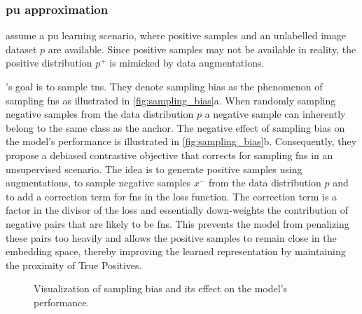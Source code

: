 \subsubsection{\acl{pu} approximation}\label{subsec:pu_approximation}

\citet{chuang_debiased_2020} assume a \acf{pu} learning scenario, 
where positive samples and an unlabelled image dataset $p$ are available.
Since positive samples may not be available in reality, 
the positive distribution $p^+$ is mimicked by data augmentations.

\citeauthor{chuang_debiased_2020}'s goal is to sample \acp{tn}.
They denote sampling bias as the phenomenon of sampling \acp{fn} as illustrated in \autoref{fig:sampling_bias}a.
When randomly sampling negative samples from the data distribution $p$ 
a negative sample can inherently belong to the same class as the anchor.
The negative effect of sampling bias on the model's performance is illustrated in \autoref{fig:sampling_bias}b. %
Consequently, they propose a debiased contrastive objective that corrects for sampling \acp{fn} 
in an unsupervised scenario.
The idea is to generate positive samples using augmentations,
to sample negative samples $x^-$ from the data distribution $p$
and to add a correction term for \acp{fn} in the loss function. 
The correction term is a factor in the divisor of the loss and 
essentially down-weights the contribution of negative pairs that are likely to be \acp{fn}. 
This prevents the model from penalizing these pairs too heavily and 
allows the positive samples to remain close in the embedding space, 
thereby improving the learned representation by maintaining the proximity of True Positives.

\begin{figure}%
    \centering
    \qquad
    \caption{Visualization of sampling bias and its effect on the model's performance.}%
    \label{fig:sampling_bias}%
\end{figure}